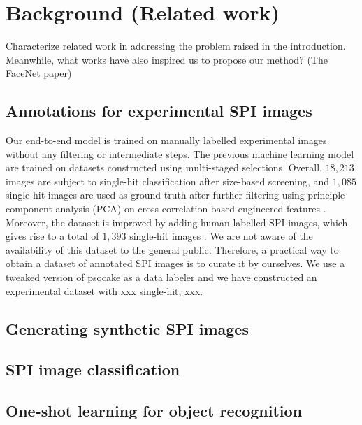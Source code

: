 \section{Background (Related work)}


{
\setlength{\parindent}{4em}
\color{gray} 

\indent Characterize related work in addressing the problem raised in the
introduction. Meanwhile, what works have also inspired us to propose our method?  (The
FaceNet paper)

}

\subsection{Annotations for experimental SPI images}


Our end-to-end model is trained on manually labelled experimental images without
any filtering or intermediate steps.  The previous machine learning model
\cite{ignatenkoClassificationDiffractionPatterns2021} are trained on datasets
constructed using multi-staged selections. Overall, $18,213$ images are subject
to single-hit classification after size-based screening, and $1,085$ single hit
images are used as ground truth after further filtering using principle
component analysis (PCA) on cross-correlation-based engineered features
\cite{roseSingleparticleImagingSymmetry2018}. Moreover, the dataset is improved
by adding human-labelled SPI images, which gives rise to a total of $1,393$
single-hit images \cite{liDiffractionDataAerosolized2020a}.  We are not aware of
the availability of this dataset to the general public.  Therefore, a practical
way to obtain a dataset of annotated SPI images is to curate it by ourselves.
We use a tweaked version of psocake as a data labeler and we have constructed an
experimental dataset with {\color{red}xxx} single-hit, {\color{red}xxx}.  


\subsection{Generating synthetic SPI images}


\subsection{SPI image classification}


\subsection{One-shot learning for object recognition}
